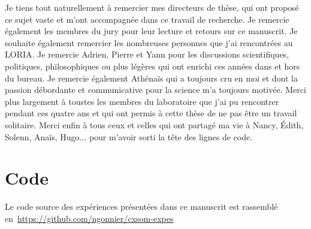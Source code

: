 \documentclass[11pt]{thesul-cs}
\begin{document}
  \begin{ThesisAcknowledgments}
  
Je tiens tout naturellement à remercier mes directeurs de thèse, qui ont proposé ce sujet vaste et m'ont accompagnée dans ce travail de recherche. Je remercie également les membres du jury pour leur lecture et retours sur ce manuscrit.
Je souhaite également remercier les nombreuses personnes que j'ai rencontrées au LORIA.
Je remercie Adrien, Pierre et Yann pour les discussions scientifiques, politiques, philosophiques ou plus légères qui ont enrichi ces années dans et hors du bureau. Je remercie également Athénaïs qui a toujours cru en moi et dont la passion débordante et communicative pour la science m'a toujours motivée. Merci plus largement à toustes les membres du laboratoire que j'ai pu rencontrer pendant ces quatre ans et qui ont permis à cette thèse de ne pas être un travail solitaire.
Merci enfin à tous ceux et celles qui ont partagé ma vie à Nancy, \'Edith, Solenn, Anaïs, Hugo... pour m'avoir sorti la tête des lignes de code.

\end{ThesisAcknowledgments}

\setcounter{tocdepth}{1}
\tableofcontents

\mainmatter









\nocite{gonnier2020}
\nocite{Gonnier2021InputPU}

\printbibliography[keyword=mypublis, title={Publications}]
\section*{Code}
Le code source des expériences présentées dans ce manuscrit est rassemblé en~\url{https://github.com/ngonnier/cxsom-expes}

\printbibliography[title={Bibliographie}]
\end{document}
